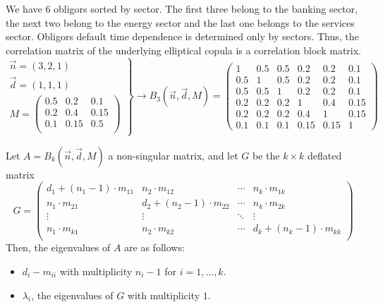 \documentclass[11pt,fleqn]{book} %
\begin{document}
\begin{example}
	\label{example1}
	We have $6$ obligors sorted by sector. The first three belong to the 
	banking sector, the next two belong to the energy sector 
	and the last one belongs to the services sector. Obligors default time
	dependence is determined only by sectors. Thus, the correlation matrix 
	of the underlying elliptical copula is a correlation block matrix.
	\small
	\begin{displaymath}
		\left.
		\begin{array}{l}
			\vec{n} = \left(3,2,1\right) \\
			\vec{d} = \left(1,1,1\right) \\
			M = \left(
			\begin{array}{ccc}
				0.5 & 0.2  & 0.1  \\
				0.2 & 0.4  & 0.15 \\
				0.1 & 0.15 & 0.5  \\
			\end{array}
			\right)
		\end{array}
		\right\}
		\rightarrow
		B_3(\vec{n},\vec{d},M)=
		\left(
		\begin{array}{ccc|cc|c} 
			1   & 0.5 & 0.5 & 0.2  & 0.2  & 0.1  \\ 
			0.5 & 1   & 0.5 & 0.2  & 0.2  & 0.1  \\ 
			0.5 & 0.5 & 1   & 0.2  & 0.2  & 0.1  \\ 
			\hline
			0.2 & 0.2 & 0.2 & 1    & 0.4  & 0.15 \\ 
			0.2 & 0.2 & 0.2 & 0.4  & 1    & 0.15 \\ 
			\hline
			0.1 & 0.1 & 0.1 & 0.15 & 0.15 & 1    
		\end{array} 
		\right)
	\end{displaymath}
\end{example}

\begin{proposition}
	\label{prop1}
	Let $A = B_k(\vec{n}, \vec{d}, M)$ a non-singular matrix, and let $G$ be 
	the $k {\times} k$ deflated matrix
	\begin{displaymath}
		G =
		\left( \begin{array}{cccc}
		d_1+(n_1-1)\cdot m_{11} & n_2 \cdot m_{12}        & \cdots & n_k \cdot m_{1k} \\
		n_1\cdot m_{21}         & d_2+(n_2-1)\cdot m_{22} & \cdots & n_k \cdot m_{2k} \\
		\vdots                  & \vdots                  & \ddots & \vdots \\
		n_1\cdot m_{k1}         & n_2 \cdot m_{k2}        & \cdots & d_k+(n_k-1)\cdot m_{kk} \\
		\end{array} \right)
	\end{displaymath}
	Then, the eigenvalues of $A$ are as follows:
	\begin{itemize}
		\item $d_{i}-m_{ii}$ with multiplicity $n_i-1$ for $i=1,\dots,k$.
		\item $\lambda_i$, the eigenvalues of $G$ with multiplicity $1$.
	\end{itemize}
\end{proposition}
\end{document}

